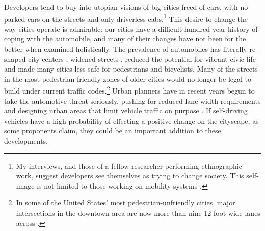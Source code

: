 


Developers tend to buy into utopian visions of big cities freed of cars, with no
parked cars on the streets and only driverless cabs.\footnote{My
  interviews, and those of a fellow researcher performing ethnographic
  work, suggest developers see
themselves as trying to change society. This self-image is not limited
to those working on mobility systems \cite{naughtonTech}.} This desire to
change the way cities operate is admirable: our cities have a
difficult hundred-year history of coping with the
automobile, and many of their changes have not been for the better
when examined holistically. The prevalence of automobiles has
literally re-shaped city centers \cite[p. 7]{burdenCities}, widened
streets \cite[p. 10]{burdenCities} \cite[p. 65]{fernandezBoulder},
reduced the potential for vibrant civic life \cite[p. 60]{miaraBoston}
and made many cities less safe for 
pedestrians and bicyclists. Many of the streets in the most
pedestrian-friendly zones of older cities would no longer be legal to
build under 
current traffic codes.\footnote{In some of the
United States' most pedestrian-unfriendly cities, major intersections
in the downtown area are now more than nine 12-foot-wide lanes across
\cite{citylab}.} Urban planners have
in recent years begun to take the automotive threat seriously, pushing
for reduced lane-width requirements and designing urban areas that
limit vehicle traffic on purpose \cite[p. 67]{fernandezBoulder}. If self-driving
vehicles have a high probability of effecting a positive change on the
cityscape, as some proponents claim, they could be an important
addition to these developments.

